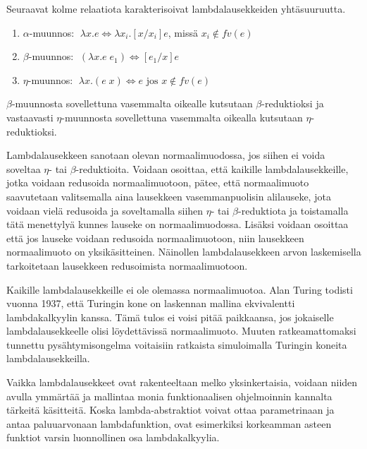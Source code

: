 \begin{maar}
Seuraavat kolme relaatiota karakterisoivat lambdalausekkeiden yhtäsuuruutta.

\begin{enumerate}
	\item $\alpha$-muunnos: $\; \lambda x.e \Leftrightarrow \lambda x_{i}.[x/x_{i}]e$, missä $x_{i} \notin fv(e)$
	\item $\beta$-muunnos: $\; (\lambda x.e \; e_{1}) \Leftrightarrow [e_{1} / x]e$
	\item $\eta$-muunnos: $\; \lambda x.(e \; x) \Leftrightarrow e \text{ jos } x \notin fv(e)$
\end{enumerate}
$\beta$-muunnosta sovellettuna vasemmalta oikealle kutsutaan $\beta$-reduktioksi ja vastaavasti $\eta$-muunnosta sovellettuna vasemmalta oikealla kutsutaan $\eta$-reduktioksi.
\end{maar}
\par
Lambdalausekkeen sanotaan olevan normaalimuodossa, jos siihen ei voida soveltaa $\eta$- tai $\beta$-reduktioita. Voidaan osoittaa, että kaikille lambdalausekkeille, jotka voidaan redusoida normaalimuotoon, pätee, että normaalimuoto saavutetaan valitsemalla aina lausekkeen vasemmanpuolisin alilauseke, jota voidaan vielä redusoida ja soveltamalla siihen $\eta$- tai $\beta$-reduktiota ja toistamalla tätä menettylyä kunnes lauseke on normaalimuodossa. Lisäksi voidaan osoittaa että jos lauseke voidaan redusoida normaalimuotoon, niin lausekkeen normaalimuoto on yksikäsitteinen. Näinollen lambdalausekkeen arvon laskemisella tarkoitetaan lausekkeen redusoimista normaalimuotoon.
\par
Kaikille lambdalausekkeille ei ole olemassa normaalimuotoa. Alan Turing todisti vuonna 1937, että Turingin kone on laskennan mallina ekvivalentti lambdakalkyylin kanssa. Tämä tulos ei voisi pitää paikkaansa, jos jokaiselle lambdalausekkeelle olisi löydettävissä normaalimuoto. Muuten ratkeamattomaksi tunnettu pysähtymisongelma voitaisiin ratkaista simuloimalla Turingin koneita lambdalausekkeilla.
\par 
Vaikka lambdalausekkeet ovat rakenteeltaan melko yksinkertaisia, voidaan niiden avulla ymmärtää ja mallintaa monia funktionaalisen ohjelmoinnin kannalta tärkeitä käsitteitä. Koska lambda-abstraktiot voivat ottaa parametrinaan ja antaa paluuarvonaan lambdafunktion, ovat esimerkiksi korkeamman asteen funktiot varsin luonnollinen osa lambdakalkyylia. 